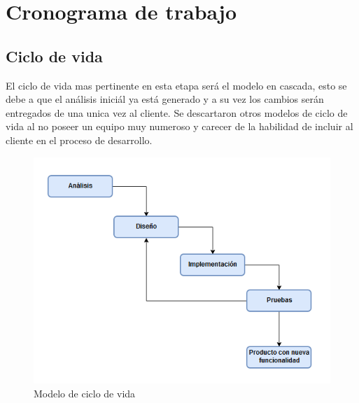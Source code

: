 \section{Cronograma de trabajo}

\subsection{Ciclo de vida}

El ciclo de vida mas pertinente en esta etapa será el modelo en cascada, esto se debe a que el análisis iniciál ya está generado y a su vez los cambios serán entregados de una unica vez al cliente. Se descartaron otros modelos de ciclo de vida al no poseer un equipo muy numeroso y carecer de la habilidad de incluir al cliente en el proceso de desarrollo. \\

\begin{figure}[H]
    \centering
    \includegraphics[scale=0.6]{Files/iterativeIncremental.png}
    \caption{Modelo de ciclo de vida}
    \label{fig:clases}
\end{figure}

